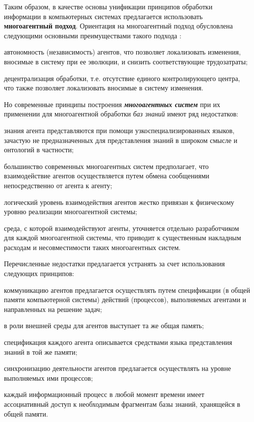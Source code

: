 \begin{SCn}
{Таким образом, в качестве основы унификации принципов обработки информации в компьютерных системах предлагается использовать \textbf{многоагентный подход}. Ориентация на многоагентный подход обусловлена следующими основными преимуществами такого подхода \cite{Wooldridge2009}:

\begin{scnitemize}
    \item автономность (независимость) агентов, что позволяет локализовать изменения, вносимые в систему при ее эволюции, и снизить соответствующие трудозатраты;
    \item децентрализация обработки, т.е. отсутствие единого контролирующего центра, что также позволяет локализовать вносимые в систему изменения.
\end{scnitemize}

Но современные принципы построения \textit{\textbf{многоагентных систем}} при их применении для многоагентной обработки \textit{баз знаний} имеют ряд недостатков:
\begin{scnitemize}
    \item знания агента представляются при помощи узкоспециализированных языков, зачастую не предназначенных для представления знаний в широком смысле и онтологий в частности;
    \item большинство современных многоагентных систем предполагает, что взаимодействие агентов осуществляется путем обмена сообщениями непосредственно от агента к агенту;
    \item логический уровень взаимодействия агентов жестко привязан к физическому уровню реализации многоагентной системы;
    \item среда, с которой взаимодействуют агенты, уточняется отдельно разработчиком для каждой многоагентной системы, что приводит к существенным накладным расходам и несовместимости таких многоагентных систем.
\end{scnitemize}

Перечисленные недостатки предлагается устранять за счет использования следующих принципов:
\begin{scnitemize}
    \item коммуникацию агентов предлагается осуществлять путем спецификации (в общей памяти компьютерной системы) действий (процессов), выполняемых агентами и направленных на решение задач;
    \item в роли внешней среды для агентов выступает та же общая память;
    \item спецификация каждого агента описывается средствами языка представления знаний в той же памяти;
    \item синхронизацию деятельности агентов предлагается осуществлять на уровне выполняемых ими процессов;
    \item каждый информационный процесс в любой момент времени имеет ассоциативный доступ к необходимым фрагментам базы знаний, хранящейся в общей памяти.
\end{scnitemize}
}

\scnendstruct

\end{SCn}